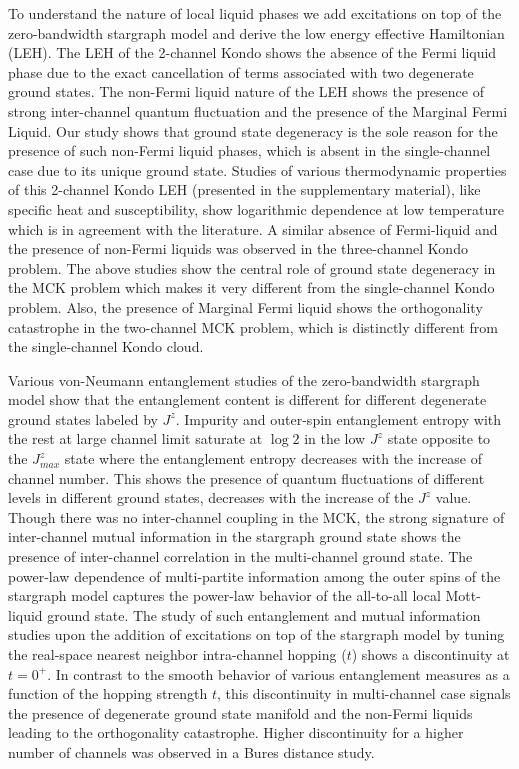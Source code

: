 \documentclass[reprint,prb,superscriptaddress]{revtex4-2}
\begin{document}
\par To understand the nature of local liquid phases we add excitations on top of the zero-bandwidth stargraph model and derive the low energy effective Hamiltonian (LEH). The LEH of the 2-channel Kondo shows the absence of the Fermi liquid phase due to the exact cancellation of terms associated with two degenerate ground states. The non-Fermi liquid nature of the LEH shows the presence of strong inter-channel quantum fluctuation and the presence of the Marginal Fermi Liquid. Our study shows that ground state degeneracy is the sole reason for the presence of such non-Fermi liquid phases, which is absent in the single-channel case due to its unique ground state. Studies of various thermodynamic properties of this 2-channel Kondo LEH (presented in the supplementary material), like specific heat and susceptibility, show logarithmic dependence at low temperature which is in agreement with the literature.
A similar absence of Fermi-liquid and the presence of non-Fermi liquids was observed in the three-channel Kondo problem. The above studies show the central role of ground state degeneracy in the MCK problem which makes it very different from the single-channel Kondo problem. Also, the presence of Marginal Fermi liquid shows the orthogonality catastrophe in the two-channel MCK problem, which is distinctly different from the single-channel Kondo cloud.

\par Various von-Neumann entanglement studies of the zero-bandwidth stargraph model show that the entanglement content is different for different degenerate ground states labeled by $J^z$. Impurity and outer-spin entanglement entropy with the rest at large channel limit saturate at $\log 2$ in the low $J^z$ state opposite to the $J^z_{max}$ state where the entanglement entropy decreases with the increase of channel number. This shows the presence of quantum fluctuations of different levels in different ground states, decreases with the increase of the $J^z$ value. Though there was no inter-channel coupling in the MCK, the strong signature of inter-channel mutual information in the stargraph ground state shows the presence of inter-channel correlation in the multi-channel ground state. The power-law dependence of multi-partite information among the outer spins of the stargraph model captures the power-law behavior of the all-to-all local Mott-liquid ground state. The study of such entanglement and mutual information studies upon the addition of excitations on top of the stargraph model by tuning the real-space nearest neighbor intra-channel hopping ($t$) shows a discontinuity at $t=0^+$. In contrast to the smooth behavior of various entanglement measures as a function of the hopping strength $t$, this discontinuity in multi-channel case signals the presence of degenerate ground state manifold and the non-Fermi liquids leading to the orthogonality catastrophe. Higher discontinuity for a higher number of channels was observed in a Bures distance study.
\end{document}
